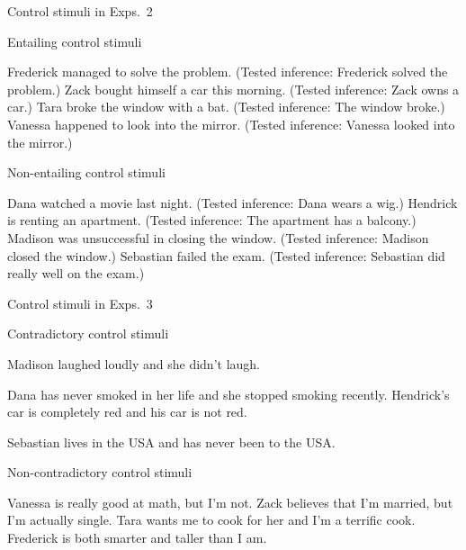 \documentclass[11pt,fleqn]{article}
\newcommand{\6}{\mbox{$[\hspace*{-.6mm}[$}}
\newcommand{\9}{\mbox{$]\hspace*{-.6mm}]$}}
\begin{document}
\begin{exe}
 Control stimuli in Exps.~2
\begin{xlist}
\ex Entailing control stimuli
\begin{xlist}
 Frederick managed to solve the problem. (Tested inference: Frederick solved the problem.)
 Zack bought himself a car this morning. (Tested inference: Zack owns a car.)
 Tara broke the window with a bat. (Tested inference: The window broke.)
 Vanessa happened to look into the mirror. (Tested inference: Vanessa looked into the mirror.)
\end{xlist}
\ex Non-entailing control stimuli
\begin{xlist}
 Dana watched a movie last night. (Tested inference: Dana wears a wig.)
 Hendrick is renting an apartment. (Tested inference: The apartment has a balcony.)
 Madison was unsuccessful in closing the window. (Tested inference:  Madison closed the window.)
 Sebastian failed the exam. (Tested inference: Sebastian did really well on the exam.)
\end{xlist}
\end{xlist}
\end{exe}

\begin{exe}
 Control stimuli in Exps.~3
\begin{xlist}
\ex Contradictory control stimuli
\begin{xlist}
\ex Madison laughed loudly and she didn't laugh.

\ex Dana has never smoked in her life and she stopped smoking recently.
\ex Hendrick's car is completely red and his car is not red.

\ex Sebastian lives in the USA and has never been to the USA.
\end{xlist}

\ex Non-contradictory control stimuli
\begin{xlist}
\ex Vanessa is really good at math, but I'm not.
\ex Zack believes that I'm married, but I'm actually single.
\ex Tara wants me to cook for her and I'm a terrific cook.
\ex Frederick is both smarter and taller than I am.

\end{xlist}
\end{xlist}
\end{exe}
\end{document}
